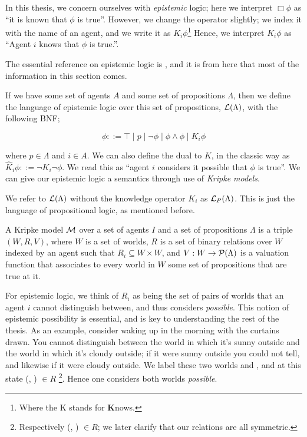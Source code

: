 \documentclass[10pt, a4paper]{report}
\begin{document}
In this thesis, we concern ourselves with \emph{epistemic} logic; here we
interpret $\Box \phi$ as ``it is known that $\phi$ is true''. However, we
change the operator slightly; we index it with the name of an agent, and we
write it as $K_i \phi$\footnote{Where the K stands for \textbf{K}nows.} Hence,
we interpret $K_i \phi$ as ``Agent $i$ knows that $\phi$ is true.''.

The essential reference on epistemic logic is \cite{ReasoningAboutKnowledge},
and it is from here that most of the information in this section comes.
  
If we have some set of agents $A$ and some set of propositions $\Lambda$, then
we define the language of epistemic logic over this set of propositions,
$\mathcal{L}(\Lambda)$, with the following BNF;

\begin{equation*}
  \phi ::= \top \mid p \mid \neg \phi \mid \phi \land \phi \mid K_i \phi
\end{equation*}

\noindent where $p \in \Lambda$ and $i \in A$. We can also define the dual to
$K$, in the classic way as $\widehat K_i \phi ::= \neg K_i \neg \phi$. We read
this as ``agent $i$ considers it possible that $\phi$ is true''. We can give our
epistemic logic a semantics through use of \emph{Kripke models}.

We refer to $\mathcal{L}(\Lambda)$ without the knowledge operator $K_i$ as
$\mathcal{L}_P(\Lambda)$. This is just the language of propositional logic, as
mentioned before. 

A Kripke model $\mathcal{M}$ over a set of agents $I$ and a set of propositions
$\Lambda$ is a triple $(W, R, V)$, where $W$ is a set of worlds, $R$ is a set of
binary relations over $W$ indexed by an agent such that $R_i \subseteq W \times
W$, and $V : W \rightarrow \mathcal{P}(\Lambda)$ is a valuation function that
associates to every world in $W$ some set of propositions that are true at it.

For epistemic logic, we think of $R_i$ as being the set of pairs of worlds that
an agent $i$ cannot distinguish between, and thus considers \emph{possible}.
This notion of epistemic possibility is essential, and is key to understanding
the rest of the thesis. As an example, consider waking up in the morning with
the curtains drawn. You cannot distinguish between the world in which it's sunny
outside and the world in which it's cloudy outside; if it were sunny outside you
could not tell, and likewise if it were cloudy outside. We label these two
worlds \Sun and \Cloud, and at this state (\Sun, \Cloud) $\in R$
\footnote{Respectively (\Cloud, \Sun) $\in R$; we later clarify that our
  relations are all symmetric.}. Hence one
considers both worlds \emph{possible}.
\end{document}
